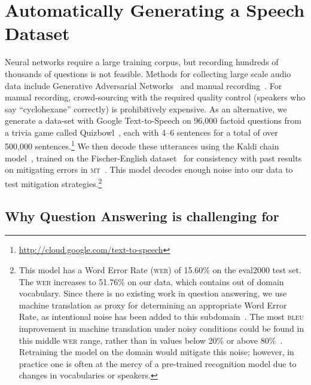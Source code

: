 	
\section{Automatically Generating a Speech Dataset}
\label{sec:data}

Neural networks require a large training corpus, but recording
hundreds of thousands of questions is not feasible. 
%
Methods for collecting large scale audio data include Generative Adversarial Networks~\citep{donahue2018exploring} and manual recording~\citep{lee2018odsqa}.
%
For manual recording, crowd-sourcing with the required quality control (speakers who say ``cyclohexane'' correctly) is prohibitively expensive.
%
As an alternative, we generate a data-set with Google Text-to-Speech on 96,000 factoid questions from a trivia game called Quizbowl~\citep{Boyd-Graber:Feng:Rodriguez-2018}, each with 4--6 sentences for a total of over 500,000 sentences.\footnote{\url{http://cloud.google.com/text-to-speech}}
%
We then decode these utterances using the Kaldi chain model~\citep{peddinti2015jhu}, trained on the Fischer-English dataset~\citep{cieri2004fisher} for consistency with past results on mitigating \asr{} errors in \textsc{mt}~\citep{sperber17emnlp}.  
%
This model decodes enough noise into our data to test mitigation strategies.\footnote{
This model has a Word Error Rate (\textsc{wer}) of 15.60\% on the eval2000 test set.
%
  The \textsc{wer} increases to 51.76\% on our \qb{} data, which contains out of domain vocabulary.   
  Since there is no existing work in question answering, we use machine translation as proxy for determining an appropriate Word Error Rate, as intentional noise has been added to this subdomain~\citep{michel2018mtnt, belinkov2017synthetic}.
  The most \textsc{bleu} improvement in machine translation under noisy conditions could be found in this middle  \textsc{wer} range, rather than in values below 20\% or above 80\%~\citep{sperber17emnlp}. 
   Retraining the model on the \qb{} domain would mitigate this noise;
however, in practice one is often at the mercy of a pre-trained
recognition model due to changes in vocabularies or speakers.
%
}

%


\subsection{Why Question Answering is challenging for }
\label{sec:noise}


